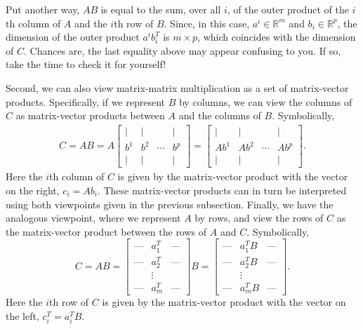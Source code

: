 \documentclass[12pt]{article}
\begin{document}
Put another way, $AB$ is equal to the sum, over all $i$, of the outer
product of the $i$th 
column of $A$ and the $i$th row of $B$.  Since, in this case, $a^i \in
\mathbb{R}^m$ and $b_i \in \mathbb{R}^p$, the dimension of the
outer product $a^i b^T_i$ is $m \times p$, which coincides with the
dimension of $C$.  Chances are, the last equality above may appear 
confusing to you.  If so, take the time to check it for yourself!

Second, we can also view matrix-matrix multiplication as a set of
matrix-vector products. Specifically, if we represent $B$ by columns,
we can view the columns of $C$ as matrix-vector products between $A$
and the columns of $B$.  Symbolically,
\begin{align}
C = AB = A \left [ \begin{array}{cccc} | & | &  & | \\ b^1 & b^2 &
    \cdots & b^p \\ | & | &  & | \end{array} \right ] = \left [
    \begin{array}{cccc} | & | &  & | \\ A b^1 & A b^2 & \cdots & A b^p \\ |
      & | &  & | \end{array} \right ]. \label{eqn:1}
\end{align}
Here the $i$th column of $C$ is given by the matrix-vector product
with the vector on the right, $c_i = A b_i$.  These matrix-vector
products can in turn be interpreted using both viewpoints given in the
previous subsection.  Finally, we have the analogous viewpoint, where
we represent $A$ by rows, and view the rows of $C$ as the
matrix-vector product between the rows of $A$ and $C$.  Symbolically,
\[C = AB = \left [ \begin{array}{ccc} \mbox{---} & a^T_1 & 
  \mbox{---} \\   \mbox{---} & a^T_2 &  \mbox{---} \\ & \vdots & \\
  \mbox{---} & a^T_m  &  \mbox{---} \end{array} \right ] B = \left [
  \begin{array}{ccc} \mbox{---} & a^T_1 B &  \mbox{---} \\   \mbox{---}
  & a^T_2 B &  \mbox{---} \\ & \vdots & \\ 
  \mbox{---} & a^T_m B  &  \mbox{---} \end{array} \right ]. \]
Here the $i$th row of $C$ is given by the matrix-vector product with
the vector on the left, $c_i^T = a_i^T B$.
\end{document}
